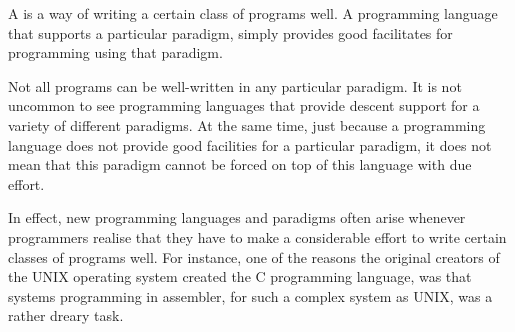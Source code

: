 A  is a way of writing a certain class of programs
well. A programming language that supports a particular paradigm, simply
provides good facilitates for programming using that paradigm.

Not all programs can be well-written in any particular paradigm. It is not
uncommon to see programming languages that provide descent support for a
variety of different paradigms. At the same time, just because a programming
language does not provide good facilities for a particular paradigm, it does
not mean that this paradigm cannot be forced on top of this language with due
effort.

In effect, new programming languages and paradigms often arise whenever
programmers realise that they have to make a considerable effort to write
certain classes of programs well.  For instance, one of the reasons the
original creators of the UNIX operating system created the C programming
language, was that systems programming in assembler, for such a complex system
as UNIX, was a rather dreary task\cite{the-development-of-c}.

